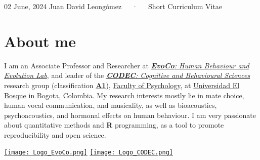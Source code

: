 \documentclass[11pt,a4paper,]{awesome-cv}
\begin{document}
\makecvheader

\makecvfooter
  {02 June, 2024}
    {Juan David Leongómez~~~·~~~Short Curriculum Vitae}
  {\thepage}





\section{About me}\label{about-me}

\begin{minipage}[c]{0.9\linewidth}
I am an Associate Professor and Researcher at \href{https://jdleongomez.info/en/team/}{\textit{\textbf{EvoCo}: Human Behaviour and Evolution Lab}}, and leader of the \href{https://investigaciones.unbosque.edu.co/codec}{\textit{\textbf{CODEC}: Cognitive and Behavioural Sciences}} research group (classification \href{https://scienti.minciencias.gov.co/gruplac/jsp/visualiza/visualizagr.jsp?nro=00000000001446}{\textbf{A1}}), \href{https://www.uelbosque.edu.co/psicologia}{Faculty of Psychology}, at \href{https://www.uelbosque.edu.co/}{Universidad El Bosque} in Bogota, Colombia. My research interests mostly lie in mate choice, human vocal communication, and musicality, as well as bioacoustics, psychoacoustics, and hormonal effects on human behaviour. I am very passionate about quantitative methods and \textbf{R} programming, as a tool to promote reproducibility and open science.
\end{minipage} \begin{minipage}[c]{0.1\linewidth}
\begin{flushright} 
\hfill \href{https://jdleongomez.info/en/team/}{\texttt{[image: Logo\_EvoCo.png]}} \newline \href{https://investigaciones.unbosque.edu.co/codec}{\texttt{[image: Logo\_CODEC.png]}}
\end{flushright}
\end{minipage}
\end{document}
